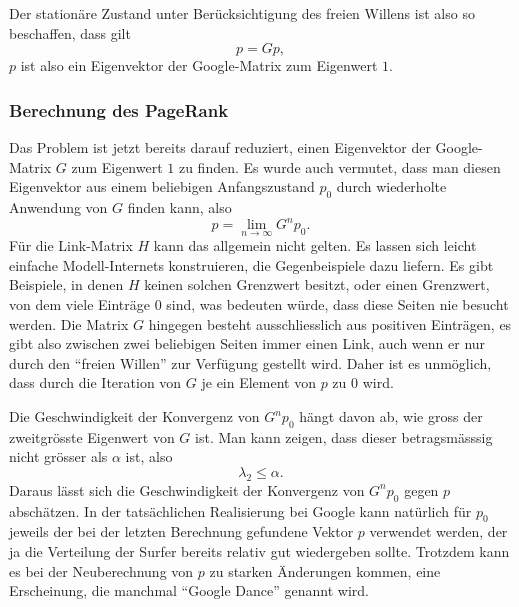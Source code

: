 Der stationäre Zustand unter Berücksichtigung des freien Willens ist also
so beschaffen, dass gilt
\[
p=Gp,
\]
$p$ ist also ein Eigenvektor der Google-Matrix zum Eigenwert $1$.

\subsubsection{Berechnung des PageRank}
Das Problem ist jetzt bereits darauf reduziert, einen Eigenvektor der
Google-Matrix $G$ zum Eigenwert $1$ zu finden.
Es wurde auch vermutet, dass man diesen Eigenvektor
aus einem beliebigen Anfangszustand $p_0$ durch wiederholte Anwendung von
$G$ finden kann, also
\[
p=\lim_{n\to\infty}G^np_0.
\]
Für die Link-Matrix $H$ kann das allgemein nicht gelten.
Es lassen sich leicht einfache Modell-Internets konstruieren,
die Gegenbeispiele dazu liefern.
Es gibt Beispiele, in denen
$H$ keinen solchen Grenzwert besitzt, oder einen Grenzwert, von dem
viele Einträge $0$ sind, was bedeuten würde, dass diese Seiten nie besucht
werden.
Die Matrix $G$ hingegen besteht ausschliesslich aus positiven Einträgen, es
gibt also zwischen zwei beliebigen Seiten immer einen Link, auch wenn er nur
durch den ``freien Willen'' zur Verfügung gestellt wird.
Daher ist es unmöglich,
dass durch die Iteration von $G$ je ein Element von $p$ zu $0$ wird.

Die Geschwindigkeit der Konvergenz von $G^np_0$ hängt davon ab, wie gross der
zweitgrösste Eigenwert von $G$ ist.
Man kann zeigen, dass dieser betragsmässsig
nicht grösser als $\alpha$ ist, also
\[
\lambda_2\le \alpha.
\]
Daraus lässt sich die Geschwindigkeit der Konvergenz von $G^np_0$ gegen $p$
abschätzen.
In der tatsächlichen Realisierung bei Google kann natürlich
für $p_0$ jeweils der bei der letzten Berechnung gefundene Vektor $p$ verwendet
werden, der ja die Verteilung der Surfer bereits relativ gut wiedergeben sollte.
Trotzdem kann es bei der Neuberechnung von $p$ zu starken Änderungen kommen,
eine Erscheinung, die manchmal ``Google Dance'' genannt wird.

